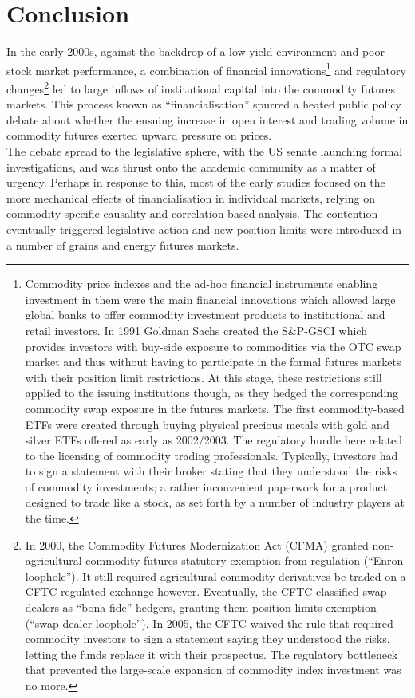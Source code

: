\documentclass[
  authoryear,
  preprint,
  3p]{elsarticle}
\begin{document}
\newpage

\section{Conclusion}\label{conclusion}

In the early 2000s, against the backdrop of a low yield environment and
poor stock market performance, a combination of financial
innovations\footnote{Commodity price indexes and the ad-hoc financial
  instruments enabling investment in them were the main financial
  innovations which allowed large global banks to offer commodity
  investment products to institutional and retail investors. In 1991
  Goldman Sachs created the S\&P-GSCI which provides investors with
  buy-side exposure to commodities via the OTC swap market and thus
  without having to participate in the formal futures markets with their
  position limit restrictions. At this stage, these restrictions still
  applied to the issuing institutions though, as they hedged the
  corresponding commodity swap exposure in the futures markets. The
  first commodity-based ETFs were created through buying physical
  precious metals with gold and silver ETFs offered as early as
  2002/2003. The regulatory hurdle here related to the licensing of
  commodity trading professionals. Typically, investors had to sign a
  statement with their broker stating that they understood the risks of
  commodity investments; a rather inconvenient paperwork for a product
  designed to trade like a stock, as set forth by a number of industry
  players at the time.} and regulatory changes\footnote{In 2000, the
  Commodity Futures Modernization Act (CFMA) granted non-agricultural
  commodity futures statutory exemption from regulation (``Enron
  loophole''). It still required agricultural commodity derivatives be
  traded on a CFTC-regulated exchange however. Eventually, the CFTC
  classified swap dealers as ``bona fide'' hedgers, granting them
  position limits exemption (``swap dealer loophole''). In 2005, the
  CFTC waived the rule that required commodity investors to sign a
  statement saying they understood the risks, letting the funds replace
  it with their prospectus. The regulatory bottleneck that prevented the
  large-scale expansion of commodity index investment was no more.} led
to large inflows of institutional capital into the commodity futures
markets. This process known as ``financialisation'' spurred a heated
public policy debate about whether the ensuing increase in open interest
and trading volume in commodity futures exerted upward pressure on
prices.\\
The debate spread to the legislative sphere, with the US senate
launching formal investigations, and was thrust onto the academic
community as a matter of urgency. Perhaps in response to this, most of
the early studies focused on the more mechanical effects of
financialisation in individual markets, relying on commodity specific
causality and correlation-based analysis. The contention eventually
triggered legislative action and new position limits were introduced in
a number of grains and energy futures markets.
\end{document}
